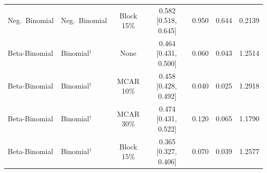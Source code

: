 \begin{table}[!htbp]
\begin{tabular}{llccccc}
Neg.\ Binomial & Neg.\ Binomial & Block 15\% & 0.582 [0.518,\,0.645] & 0.950 & 0.644 & 0.2139 \\
Beta-Binomial & Binomial$^\dag$ & None        & 0.464 [0.431,\,0.500] & 0.060 & 0.043 & 1.2514 \\
Beta-Binomial & Binomial$^\dag$ & MCAR 10\%  & 0.458 [0.428,\,0.492] & 0.040 & 0.025 & 1.2918 \\
Beta-Binomial & Binomial$^\dag$ & MCAR 30\%  & 0.474 [0.431,\,0.522] & 0.120 & 0.065 & 1.1790 \\
Beta-Binomial & Binomial$^\dag$ & Block 15\% & 0.365 [0.327,\,0.406] & 0.070 & 0.039 & 1.2577 \\
\bottomrule
\end{tabular}
\end{table}
